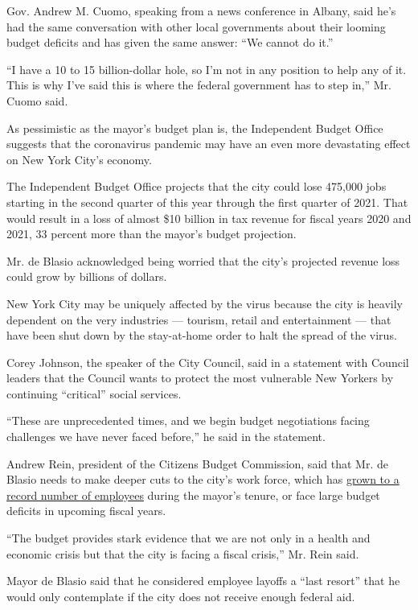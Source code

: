 Gov. Andrew M. Cuomo, speaking from a news conference in Albany, said
he's had the same conversation with other local governments about their
looming budget deficits and has given the same answer: ``We cannot do
it.''

``I have a 10 to 15 billion-dollar hole, so I'm not in any position to
help any of it. This is why I've said this is where the federal
government has to step in,'' Mr. Cuomo said.

As pessimistic as the mayor's budget plan is, the Independent Budget
Office suggests that the coronavirus pandemic may have an even more
devastating effect on New York City's economy.

The Independent Budget Office projects that the city could lose 475,000
jobs starting in the second quarter of this year through the first
quarter of 2021. That would result in a loss of almost \$10 billion in
tax revenue for fiscal years 2020 and 2021, 33 percent more than the
mayor's budget projection.

Mr. de Blasio acknowledged being worried that the city's projected
revenue loss could grow by billions of dollars.

New York City may be uniquely affected by the virus because the city is
heavily dependent on the very industries --- tourism, retail and
entertainment --- that have been shut down by the stay-at-home order to
halt the spread of the virus.

Corey Johnson, the speaker of the City Council, said in a statement with
Council leaders that the Council wants to protect the most vulnerable
New Yorkers by continuing ``critical'' social services.

``These are unprecedented times, and we begin budget negotiations facing
challenges we have never faced before,'' he said in the statement.

Andrew Rein, president of the Citizens Budget Commission, said that Mr.
de Blasio needs to make deeper cuts to the city's work force, which has
\href{https://cbcny.org/research/cost-growing-city-workforce}{grown to a
record number of employees} during the mayor's tenure, or face large
budget deficits in upcoming fiscal years.

``The budget provides stark evidence that we are not only in a health
and economic crisis but that the city is facing a fiscal crisis,'' Mr.
Rein said.

Mayor de Blasio said that he considered employee layoffs a ``last
resort'' that he would only contemplate if the city does not receive
enough federal aid.

